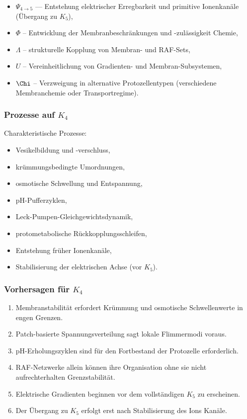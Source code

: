 \begin{itemize}
    \item $\Psi_{4\to5}$ — Entstehung elektrischer Erregbarkeit und
          primitive Ionenkanäle (Übergang zu $K_5$),
    \item $\Phi$ – Entwicklung der Membranbeschränkungen und -zulässigkeit
          Chemie,
    \item $\Lambda$ – strukturelle Kopplung von Membran- und RAF-Sets,
    \item $U$ – Vereinheitlichung von Gradienten- und Membran-Subsystemen,
    \item $\Chi$ – Verzweigung in alternative Protozellentypen (verschiedene
          Membranchemie oder Transportregime).
\end{itemize}

\subsubsection{Prozesse auf \texorpdfstring{$K_4$}{K_4}}

Charakteristische Prozesse:
\begin{itemize}
    \item Vesikelbildung und -verschluss,
    \item krümmungsbedingte Umordnungen,
    \item osmotische Schwellung und Entspannung,
    \item pH-Pufferzyklen,
    \item Leck-Pumpen-Gleichgewichtsdynamik,
    \item protometabolische Rückkopplungsschleifen,
    \item Entstehung früher Ionenkanäle,
    \item Stabilisierung der elektrischen Achse (vor $K_5$).
\end{itemize}

\subsubsection{Vorhersagen für \texorpdfstring{$K_4$}{K_4}}

\begin{enumerate}
    \item Membranstabilität erfordert Krümmung und osmotische Schwellenwerte
          in engen Grenzen.
    \item Patch-basierte Spannungsverteilung sagt lokale Flimmermodi voraus.
    \item pH-Erholungszyklen sind für den Fortbestand der Protozelle erforderlich.
    \item RAF-Netzwerke allein können ihre Organisation ohne sie nicht aufrechterhalten
          Grenzstabilität.
    \item Elektrische Gradienten beginnen vor dem vollständigen $K_5$ zu erscheinen.
    \item Der Übergang zu $K_5$ erfolgt erst nach Stabilisierung des Ions
          Kanäle.
\end{enumerate}


